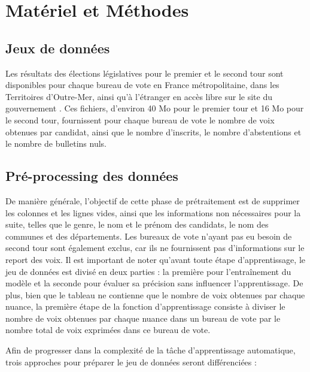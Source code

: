 \documentclass[11pt]{article}
\begin{document}
    \section{Matériel et Méthodes}

        \subsection*{Jeux de données}
            Les résultats des élections législatives pour le premier et le second tour sont disponibles pour chaque bureau de vote en France métropolitaine, dans les Territoires d'Outre-Mer, ainsi qu'à l'étranger en accès libre sur le site du gouvernement \cite{République_Française}. Ces fichiers, d'environ 40 Mo pour le premier tour et 16 Mo pour le second tour, fournissent pour chaque bureau de vote le nombre de voix obtenues par candidat, ainsi que le nombre d'inscrits, le nombre d'abstentions et le nombre de bulletins nuls.
        
        \subsection*{Pré-processing des données}
            De manière générale, l'objectif de cette phase de prétraitement est de supprimer les colonnes et les lignes vides, ainsi que les informations non nécessaires pour la suite, telles que le genre, le nom et le prénom des candidats, le nom des communes et des départements. Les bureaux de vote n'ayant pas eu besoin de second tour sont également exclus, car ils ne fournissent pas d'informations sur le report des voix. Il est important de noter qu'avant toute étape d'apprentissage, le jeu de données est divisé en deux parties : la première pour l'entraînement du modèle et la seconde pour évaluer sa précision sans influencer l'apprentissage. De plus, bien que le tableau ne contienne que le nombre de voix obtenues par chaque nuance, la première étape de la fonction d'apprentissage consiste à diviser le nombre de voix obtenues par chaque nuance dans un bureau de vote par le nombre total de voix exprimées dans ce bureau de vote.

            Afin de progresser dans la complexité de la tâche d'apprentissage automatique, trois approches pour préparer le jeu de données seront différenciées :
        
\end{document}
